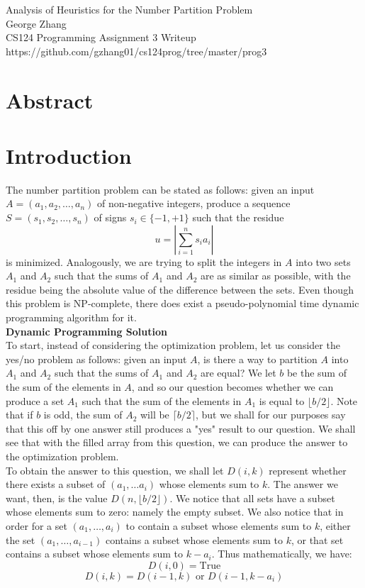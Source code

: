 \documentclass[12pt]{article}
\begin{document}
\begin{center}
Analysis of Heuristics for the Number Partition Problem \\
George Zhang \\
CS124 Programming Assignment 3 Writeup \\
https://github.com/gzhang01/cs124prog/tree/master/prog3 \\
\end{center}

\section{Abstract}



\section{Introduction}
The number partition problem can be stated as follows: given an input $A = (a_1, a_2, \dots, a_n)$ of non-negative integers, produce a sequence $S = (s_1, s_2, \dots, s_n)$ of signs $s_i \in \{-1, +1\}$ such that the residue
$$u = \left| \sum_{i = 1}^n s_ia_i \right|$$
is minimized. Analogously, we are trying to split the integers in $A$ into two sets $A_1$ and $A_2$ such that the sums of $A_1$ and $A_2$ are as similar as possible, with the residue being the absolute value of the difference between the sets. Even though this problem is NP-complete, there does exist a pseudo-polynomial time dynamic programming algorithm for it. \\

\textbf{Dynamic Programming Solution} \\
To start, instead of considering the optimization problem, let us consider the yes/no problem as follows: given an input $A$, is there a way to partition $A$ into $A_1$ and $A_2$ such that the sums of $A_1$ and $A_2$ are equal? We let $b$ be the sum of the sum of the elements in $A$, and so our question becomes whether we can produce a set $A_1$ such that the sum of the elements in $A_1$ is equal to $\lfloor b/2 \rfloor$. Note that if $b$ is odd, the sum of $A_2$ will be $\lceil b/2 \rceil$, but we shall for our purposes say that this off by one answer still produces a "yes" result to our question. We shall see that with the filled array from this question, we can produce the answer to the optimization problem. \\

To obtain the answer to this question, we shall let $D(i, k)$ represent whether there exists a subset of $(a_1, \dots a_i)$ whose elements sum to $k$. The answer we want, then, is the value $D(n, \lfloor b/2 \rfloor)$. We notice that all sets have a subset whose elements sum to zero: namely the empty subset. We also notice that in order for a set $(a_1, \dots, a_i)$ to contain a subset whose elements sum to $k$, either the set $(a_1, \dots, a_{i - 1})$ contains a subset whose elements sum to $k$, or that set contains a subset whose elements sum to $k - a_i$. Thus mathematically, we have:
$$D(i, 0) = \text{True}$$
$$D(i, k) = D(i - 1, k) \text{ or } D(i - 1, k - a_i)$$
\end{document}
